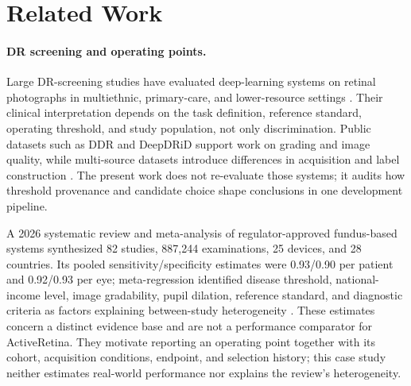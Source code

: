 \documentclass[11pt]{article}
\begin{document}
\section{Related Work}
\paragraph{DR screening and operating points.} Large DR-screening studies have evaluated deep-learning systems on retinal photographs in multiethnic, primary-care, and lower-resource settings \cite{gulshan2016,ting2017,abramoff2018,bellemo2019}. Their clinical interpretation depends on the task definition, reference standard, operating threshold, and study population, not only discrimination. Public datasets such as DDR and DeepDRiD support work on grading and image quality, while multi-source datasets introduce differences in acquisition and label construction \cite{ddr,deepdrid,drtidpaper}. The present work does not re-evaluate those systems; it audits how threshold provenance and candidate choice shape conclusions in one development pipeline.

A 2026 systematic review and meta-analysis of regulator-approved fundus-based systems synthesized 82 studies, 887,244 examinations, 25 devices, and 28 countries. Its pooled sensitivity/specificity estimates were 0.93/0.90 per patient and 0.92/0.93 per eye; meta-regression identified disease threshold, national-income level, image gradability, pupil dilation, reference standard, and diagnostic criteria as factors explaining between-study heterogeneity \cite{wang2026approveddr}. These estimates concern a distinct evidence base and are not a performance comparator for ActiveRetina. They motivate reporting an operating point together with its cohort, acquisition conditions, endpoint, and selection history; this case study neither estimates real-world performance nor explains the review's heterogeneity.
\end{document}

